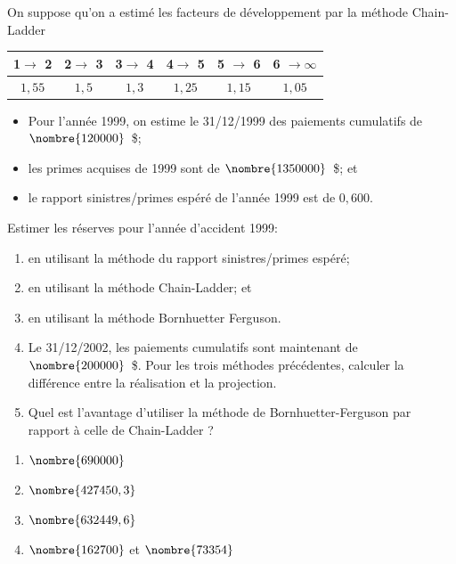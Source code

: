 \begin{exercice}
  On suppose qu'on a estimé les facteurs de développement par la
  méthode Chain-Ladder
  \begin{center}
    \begin{tabular}{|c c c c c c|}\hline
      1$\rightarrow$ 2 &  2$\rightarrow$ 3 &  3$\rightarrow$ 4 &  4$\rightarrow$ 5  &5 $\rightarrow$ 6 &6 $\rightarrow  \infty$ \\ \hline
      $1,55$ & $1,5$ & $1,3$ & $1,25$ & $1,15$ & $1,05$ \\ \hline
    \end{tabular}
  \end{center}
  \begin{itemize}
  \item Pour l'année 1999, on estime le 31/12/1999 des paiements
    cumulatifs de $\nombre{120000}$~\$;
  \item les primes acquises de 1999 sont de $\nombre{1350000}$~\$; et
  \item le rapport sinistres/primes espéré de l'année 1999 est de
    $0,600$.
  \end{itemize}
  Estimer les réserves pour l'année d'accident 1999:
  \begin{enumerate}
  \item en utilisant la méthode du rapport sinistres/primes espéré;
  \item en utilisant la méthode Chain-Ladder; et
  \item en utilisant la méthode Bornhuetter Ferguson.
  \item Le 31/12/2002, les paiements cumulatifs sont maintenant de
    $\nombre{200000}$~\$. Pour les trois méthodes précédentes,
    calculer la différence entre la réalisation et la projection.
  \item Quel est l'avantage d'utiliser la méthode de
    Bornhuetter-Ferguson par rapport à celle de Chain-Ladder ?
  \end{enumerate}
  \begin{rep}
    \begin{enumerate}
    \item $\nombre{690000}$
    \item $\nombre{427450,3}$
    \item $\nombre{632449,6}$
    \item $\nombre{162700}$ et $\nombre{73354}$
    \end{enumerate}
  \end{rep}
  \begin{sol}

\end{sol}
\end{exercice}
